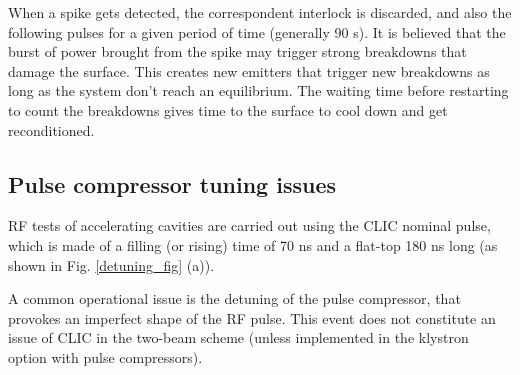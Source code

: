 When a spike gets detected, the correspondent interlock is discarded, and also the following pulses for a given period of time (generally 90 s). It is believed that the burst of power brought from the spike may trigger strong breakdowns that damage the surface. This creates new emitters that trigger new breakdowns as long as the system don't reach an equilibrium. The waiting time before restarting to count the breakdowns gives time to the surface to cool down and get reconditioned.


\subsection[Pulse compressor tuning issues]{Pulse compressor tuning issues}
\label{sec:PCtune}

RF tests of accelerating cavities are carried out using the CLIC nominal pulse, which is made of a filling (or rising) time of 70 ns and a flat-top 180 ns long (as shown in Fig. \ref{detuning_fig} (a)).

A common operational issue is the detuning of the pulse compressor, that provokes an imperfect shape of the RF pulse. This event does not constitute an issue of CLIC in the two-beam scheme (unless implemented in the klystron option with pulse compressors). 


